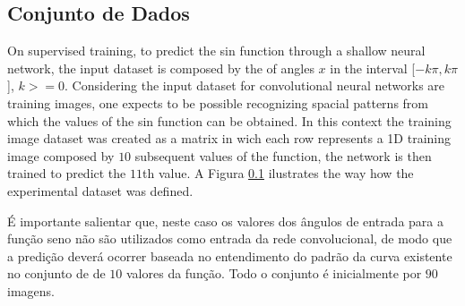 \documentclass[a4paper,10pt]{report}
\begin{document}
\subsection{Conjunto de Dados}
On supervised training, to predict the sin function through a shallow
neural network, the input dataset is composed by the of angles  $x$
in the interval [$-k\pi,k\pi$], $k >= 0$. Considering the input
dataset for convolutional neural networks are training images, one
expects to be possible recognizing spacial patterns from which the
values of the sin function can be obtained. In this context the training
image dataset was created as a matrix in wich each row represents a 1D
training image composed by $10$ subsequent values of the function, the
network is then trained to predict the $11$th value. A Figura \ref{}
ilustrates the way how the experimental dataset was defined.

É importante salientar que, neste caso os valores dos ângulos de entrada para a função
seno não são utilizados como entrada da rede convolucional, de modo que a predição
deverá ocorrer baseada no entendimento do padrão da curva existente no conjunto de
de $10$ valores da função. Todo o conjunto é inicialmente por $90$ imagens.
\end{document}
